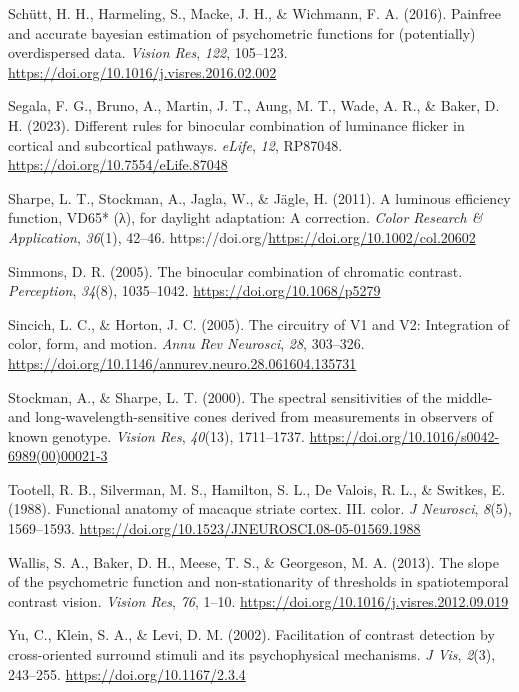 \documentclass[
  letterpaper,
  DIV=11,
  numbers=noendperiod]{scrartcl}
\newlength{\cslhangindent}
\newlength{\cslentryspacingunit} %
\newenvironment{CSLReferences}[2] %
 {%
  \setlength{\parindent}{0pt}
  \ifodd #1
  \let\oldpar\par
  \def\par{\hangindent=\cslhangindent\oldpar}
  \fi
  \setlength{\parskip}{#2\cslentryspacingunit}
 }%
 {}
\begin{document}
\begin{CSLReferences}{1}{0}
\leavevmode{}%
Schütt, H. H., Harmeling, S., Macke, J. H., \& Wichmann, F. A. (2016).
Painfree and accurate bayesian estimation of psychometric functions for
(potentially) overdispersed data. \emph{Vision Res}, \emph{122},
105--123. \url{https://doi.org/10.1016/j.visres.2016.02.002}

\leavevmode{}%
Segala, F. G., Bruno, A., Martin, J. T., Aung, M. T., Wade, A. R., \&
Baker, D. H. (2023). Different rules for binocular combination of
luminance flicker in cortical and subcortical pathways. \emph{eLife},
\emph{12}, RP87048. \url{https://doi.org/10.7554/eLife.87048}

\leavevmode{}%
Sharpe, L. T., Stockman, A., Jagla, W., \& Jägle, H. (2011). A luminous
efficiency function, VD65* (λ), for daylight adaptation: A correction.
\emph{Color Research \& Application}, \emph{36}(1), 42--46.
https://doi.org/\url{https://doi.org/10.1002/col.20602}

\leavevmode{}%
Simmons, D. R. (2005). The binocular combination of chromatic contrast.
\emph{Perception}, \emph{34}(8), 1035--1042.
\url{https://doi.org/10.1068/p5279}

\leavevmode{}%
Sincich, L. C., \& Horton, J. C. (2005). The circuitry of V1 and V2:
Integration of color, form, and motion. \emph{Annu Rev Neurosci},
\emph{28}, 303--326.
\url{https://doi.org/10.1146/annurev.neuro.28.061604.135731}

\leavevmode{}%
Stockman, A., \& Sharpe, L. T. (2000). The spectral sensitivities of the
middle- and long-wavelength-sensitive cones derived from measurements in
observers of known genotype. \emph{Vision Res}, \emph{40}(13),
1711--1737. \url{https://doi.org/10.1016/s0042-6989(00)00021-3}

\leavevmode{}%
Tootell, R. B., Silverman, M. S., Hamilton, S. L., De Valois, R. L., \&
Switkes, E. (1988). Functional anatomy of macaque striate cortex. III.
color. \emph{J Neurosci}, \emph{8}(5), 1569--1593.
\url{https://doi.org/10.1523/JNEUROSCI.08-05-01569.1988}

\leavevmode{}%
Wallis, S. A., Baker, D. H., Meese, T. S., \& Georgeson, M. A. (2013).
The slope of the psychometric function and non-stationarity of
thresholds in spatiotemporal contrast vision. \emph{Vision Res},
\emph{76}, 1--10. \url{https://doi.org/10.1016/j.visres.2012.09.019}

\leavevmode{}%
Yu, C., Klein, S. A., \& Levi, D. M. (2002). Facilitation of contrast
detection by cross-oriented surround stimuli and its psychophysical
mechanisms. \emph{J Vis}, \emph{2}(3), 243--255.
\url{https://doi.org/10.1167/2.3.4}

\end{CSLReferences}
\end{document}
